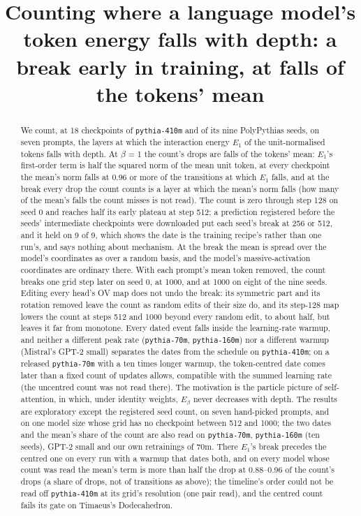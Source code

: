 \documentclass[11pt]{article}
\title{Counting where a language model's token energy falls with depth: a break early in training, at falls of the tokens' mean}
\author{}
\date{}
\begin{document}
\maketitle

\begin{abstract}
We count, at 18 checkpoints of \texttt{pythia-410m} and of its nine PolyPythias seeds, on seven prompts, the layers at which the interaction energy $E_{1}$ of the unit-normalised tokens falls with depth. At $\beta $ = 1 the count's drops are falls of the tokens' mean: $E_{1}$'s first-order term is half the squared norm of the mean unit token, at every checkpoint the mean's norm falls at 0.96 or more of the transitions at which $E_{1}$ falls, and at the break every drop the count counts is a layer at which the mean's norm falls (how many of the mean's falls the count misses is not read). The count is zero through step 128 on seed 0 and reaches half its early plateau at step 512; a prediction registered before the seeds' intermediate checkpoints were downloaded put each seed's break at 256 or 512, and it held on 9 of 9, which shows the date is the training recipe's rather than one run's, and says nothing about mechanism. At the break the mean is spread over the model's coordinates as over a random basis, and the model's massive-activation coordinates are ordinary there. With each prompt's mean token removed, the count breaks one grid step later on seed 0, at 1000, and at 1000 on eight of the nine seeds. Editing every head's OV map does not undo the break: its symmetric part and its rotation removed leave the count as random edits of their size do, and its step-128 map lowers the count at steps 512 and 1000 beyond every random edit, to about half, but leaves it far from monotone. Every dated event falls inside the learning-rate warmup, and neither a different peak rate (\texttt{pythia-70m}, \texttt{pythia-160m}) nor a different warmup (Mistral's GPT-2 small) separates the dates from the schedule on \texttt{pythia-410m}; on a released \texttt{pythia-70m} with a ten times longer warmup, the token-centred date comes later than a fixed count of updates allows, compatible with the summed learning rate (the uncentred count was not read there). The motivation is the particle picture of self-attention, in which, under identity weights, $E_\beta $ never decreases with depth. The results are exploratory except the registered seed count, on seven hand-picked prompts, and on one model size whose grid has no checkpoint between 512 and 1000; the two dates and the mean's share of the count are also read on \texttt{pythia-70m}, \texttt{pythia-160m} (ten seeds), GPT-2 small and our own retrainings of 70m. There $E_{1}$'s break precedes the centred one on every run with a warmup that dates both, and on every model whose count was read the mean's term is more than half the drop at 0.88--0.96 of the count's drops (a share of drops, not of transitions as above); the timeline's order could not be read off \texttt{pythia-410m} at its grid's resolution (one pair read), and the centred count fails its gate on Timaeus's Dodecahedron.
\end{abstract}
\end{document}
